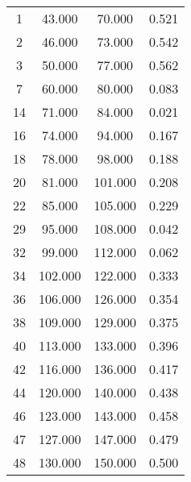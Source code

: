 % 
\begin{tabular}{cccc}
  \hline
  \hline
1 & 43.000 & 70.000 & 0.521 \\ 
  2 & 46.000 & 73.000 & 0.542 \\ 
  3 & 50.000 & 77.000 & 0.562 \\ 
  7 & 60.000 & 80.000 & 0.083 \\ 
  14 & 71.000 & 84.000 & 0.021 \\ 
  16 & 74.000 & 94.000 & 0.167 \\ 
  18 & 78.000 & 98.000 & 0.188 \\ 
  20 & 81.000 & 101.000 & 0.208 \\ 
  22 & 85.000 & 105.000 & 0.229 \\ 
  29 & 95.000 & 108.000 & 0.042 \\ 
  32 & 99.000 & 112.000 & 0.062 \\ 
  34 & 102.000 & 122.000 & 0.333 \\ 
  36 & 106.000 & 126.000 & 0.354 \\ 
  38 & 109.000 & 129.000 & 0.375 \\ 
  40 & 113.000 & 133.000 & 0.396 \\ 
  42 & 116.000 & 136.000 & 0.417 \\ 
  44 & 120.000 & 140.000 & 0.438 \\ 
  46 & 123.000 & 143.000 & 0.458 \\ 
  47 & 127.000 & 147.000 & 0.479 \\ 
  48 & 130.000 & 150.000 & 0.500 \\ 
   \hline
\end{tabular}
